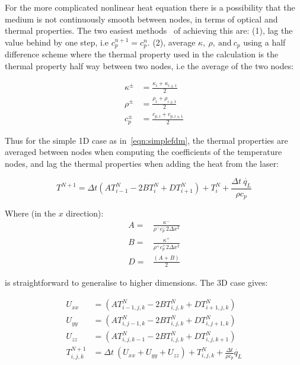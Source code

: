 \medskip

For the more complicated nonlinear heat equation there is a possibility that the medium is not continuously smooth between nodes, in terms of optical and thermal properties. The two easiest methods~\cite{ozisik1994finite} of achieving this are: (1), lag the value behind by one step, i.e $c_{p}^{n+1}=c_{p}^{n}$. (2), average $\kappa,\ \rho,\ \text{and}\ c_p$ using a half difference scheme where the thermal property used in the calculation is the thermal property half way between two nodes, i.e the average of the two nodes:

\begin{align}
\kappa^{\pm}&=\frac{\kappa_i+\kappa_{i\pm 1}}{2}\\
\rho^{\pm}&=\frac{\rho_i+\rho_{i\pm 1}}{2}\\
c_p^{\pm}&=\frac{c_{p,i}+c_{p,i\pm 1}}{2}
\end{align}

Thus for the simple 1D case as in~\cref{eqn:simplefdm}, the thermal properties are averaged between nodes when computing the coefficients of the temperature nodes, and lag the thermal properties when adding the heat from the laser:

\begin{equation}
T^{N+1}=\Delta t (AT^N_{i-1}-2BT^N_{i}+DT^N_{i+1})+ T_i^N + \frac{\Delta t\ \dot{q_L}}{\rho c_p}\label{eqn:heatnonlin1d}
\end{equation}

Where (in the $x$ direction):
\begin{align}
A=&\frac{\kappa^{-}}{\rho^{-}c_{p}^{-}2\Delta x^2} \nonumber \\
B=&\frac{\kappa^{+}}{\rho^{+}c_{p}^{+}2\Delta x^2} \label{eqn:coeffsABD}\\
D=&\frac{(A+B)}{2} \nonumber
\end{align}

 is straightforward to generalise to higher dimensions. The 3D case gives:

\begin{align}
U_{xx} &=  (A T^N_{i-1,j,k} - 2B T^N_{i,j,k} + D T^N_{i+1,j,k}) \label{eqn:FDMheat1}\\
U_{yy} &=  (A T^N_{i,j-1,k} - 2B T^N_{i,j,k} + D T^N_{i,j+1,k}) \label{eqn:FDMheat2}\\
U_{zz} &=  (A T^N_{i,j,k-1} - 2B T^N_{i,j,k} + D T^N_{i,j,k+1}) \label{eqn:FDMheat3}\\
T^{N+1}_{i,j,k} &= \Delta t\ (U_{xx} + U_{yy} + U_{zz}) + T^{N}_{i,j,k} + \tfrac{\Delta t}{\rho c_p}\dot{q_L} \label{eqn:FDMheat4}
\end{align}

